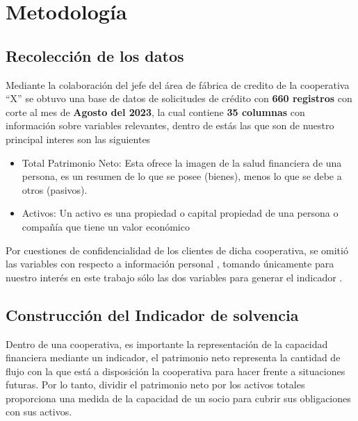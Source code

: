 \documentclass[
]{article}
\providecommand{\tightlist}{%
  \setlength{\itemsep}{0pt}\setlength{\parskip}{0pt}}
\begin{document}
\hypertarget{metodologuxeda}{%
\section{Metodología}\label{metodologuxeda}}

\hypertarget{recolecciuxf3n-de-los-datos}{%
\subsection{Recolección de los
datos}\label{recolecciuxf3n-de-los-datos}}

Mediante la colaboración del jefe del área de fábrica de credito de la
cooperativa ``X'' se obtuvo una base de datos de solicitudes de crédito
con \textbf{660 registros} con corte al mes de \textbf{Agosto del 2023},
la cual contiene \textbf{35 columnas} con información sobre variables
relevantes, dentro de estás las que son de nuestro principal interes son
las siguientes

\begin{itemize}
\tightlist
\item
  Total Patrimonio Neto: Esta ofrece la imagen de la salud financiera de
  una persona, es un resumen de lo que se posee (bienes), menos lo que
  se debe a otros (pasivos).
\item
  Activos: Un activo es una propiedad o capital propiedad de una persona
  o compañía que tiene un valor económico
\end{itemize}

Por cuestiones de confidencialidad de los clientes de dicha cooperativa,
se omitió las variables con respecto a información personal , tomando
únicamente para nuestro interés en este trabajo sólo las dos variables
para generar el indicador .

\hypertarget{construcciuxf3n-del-indicador-de-solvencia}{%
\subsection{Construcción del Indicador de
solvencia}\label{construcciuxf3n-del-indicador-de-solvencia}}

Dentro de una cooperativa, es importante la representación de la
capacidad financiera mediante un indicador, el patrimonio neto
representa la cantidad de flujo con la que está a disposición la
cooperativa para hacer frente a situaciones futuras. Por lo tanto,
dividir el patrimonio neto por los activos totales proporciona una
medida de la capacidad de un socio para cubrir sus obligaciones con sus
activos.
\end{document}
